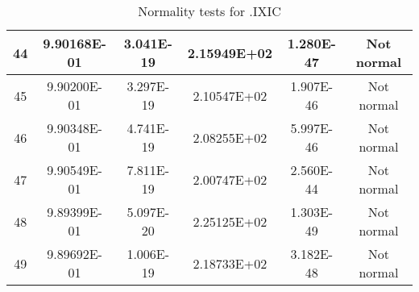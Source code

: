 \begin{table}[h]
\begin{tabular}{|c|c|c|c|c|c|}
		44 & 9.90168E-01 & 3.041E-19 & 2.15949E+02 & 1.280E-47 & Not normal\\\hline
		45 & 9.90200E-01 & 3.297E-19 & 2.10547E+02 & 1.907E-46 & Not normal\\\hline
		46 & 9.90348E-01 & 4.741E-19 & 2.08255E+02 & 5.997E-46 & Not normal\\\hline
		47 & 9.90549E-01 & 7.811E-19 & 2.00747E+02 & 2.560E-44 & Not normal\\\hline
		48 & 9.89399E-01 & 5.097E-20 & 2.25125E+02 & 1.303E-49 & Not normal\\\hline
		49 & 9.89692E-01 & 1.006E-19 & 2.18733E+02 & 3.182E-48 & Not normal\\\hline
	\end{tabular}
	\caption{Normality tests for .IXIC}
\end{table}
